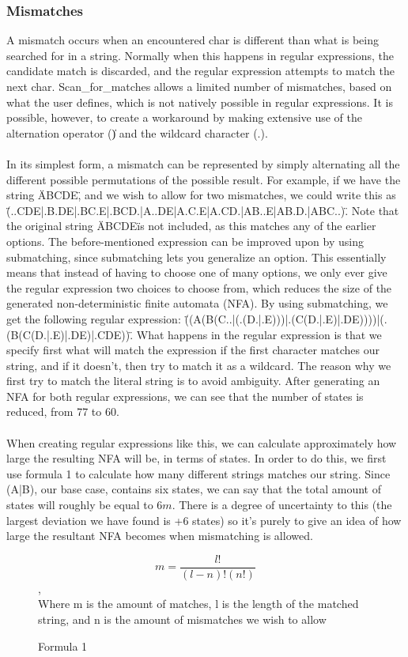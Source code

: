 \subsubsection*{Mismatches}
A mismatch occurs when an encountered char is different than what is being 
searched for in a string. Normally when this happens in regular expressions, 
the candidate match is discarded, and the regular expression attempts to 
match the next char. Scan\_for\_matches allows a limited number 
of mismatches, based on what the user defines, which is not natively possible 
in regular expressions. It is possible, however, to create a workaround by 
making extensive use of the alternation operator (\|) and the wildcard character 
(.).\\\\
In its simplest form, a mismatch can be represented by simply alternating 
all the different possible permutations of the possible result. For example, 
if we have the string \"ABCDE\", and we wish to allow for two mismatches, we 
could write this as \"(..CDE|.B.DE|.BC.E|.BCD.|A..DE|A.C.E|A.CD.|AB..E|AB.D.|ABC..)\". 
Note that the original string \"ABCDE\" is not included, as this matches any of 
the earlier options. The before-mentioned expression can be improved upon by using 
submatching, since submatching lets you generalize an option. This essentially 
means that instead of having to choose one of many options, we only ever 
give the regular expression two choices to choose from, which reduces the size 
of the generated non-deterministic finite automata (NFA). By using submatching, 
we get the following regular expression: 
\"((A(B(C..|(.(D.|.E)))|.(C(D.|.E)|.DE))))|(.(B(C(D.|.E)|.DE)|.CDE))\".
What happens in the regular expression is that we specify first what will 
match the expression if the first character matches our string, and if it doesn't, 
then try to match it as a wildcard. The reason why we first try to match 
the literal string is to avoid ambiguity. After generating an NFA for both 
regular expressions, we can see that the number of states is reduced, from 
77 to 60.\\\\
When creating regular expressions like this, we can calculate approximately how 
large the resulting NFA will be, in terms of states. In order to do this, we 
first use formula 1 to calculate how many different strings matches our 
string. Since (A|B), our base case, contains six states, we can say that 
the total amount of states will roughly be equal to $6m$. There is a degree 
of uncertainty to this (the largest deviation we have found is +6 states) 
so it's purely to give an idea of how large the resultant NFA becomes when 
mismatching is allowed.

\begin{figure}
\caption{Formula 1}
$$m = \frac{l!}{(l-n)!(n!)}$$,\\
Where m is the amount of matches, l is the length of the matched string, 
and n is the amount of mismatches we wish to allow
\end{figure}
